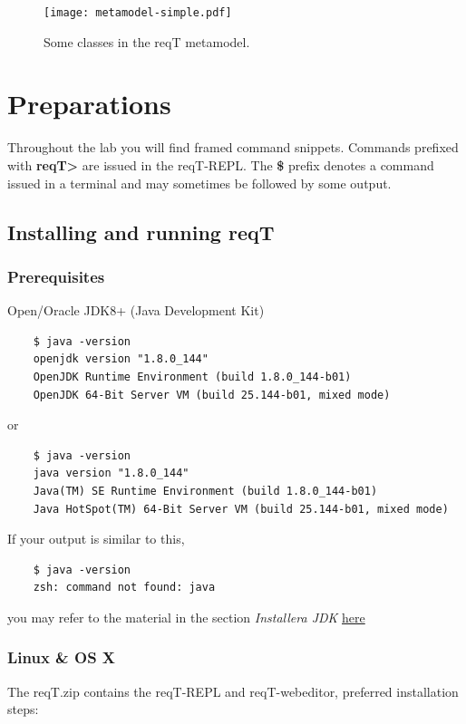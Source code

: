 \documentclass[11pt]{article}
\begin{document}
\begin{figure}[H]
  \centering
  \texttt{[image: metamodel-simple.pdf]}
  \caption{Some classes in the reqT metamodel.}
  \label{figure:metamodel}
\end{figure}

\clearpage\newpage
\section{Preparations}\label{section:preparations}
Throughout the lab you will find framed command snippets. Commands prefixed with \textbf{reqT>} are issued in the reqT-REPL. The \textbf{\$} prefix denotes a command issued in a terminal and may sometimes be followed by some output.
\subsection{Installing and running reqT}\label{section:preparations:installation}

\subsubsection{Prerequisites}
\begin{framed}
\noindent Open/Oracle JDK8+ (Java Development Kit)
{\footnotesize\begin{verbatim}
    $ java -version
    openjdk version "1.8.0_144"
    OpenJDK Runtime Environment (build 1.8.0_144-b01)
    OpenJDK 64-Bit Server VM (build 25.144-b01, mixed mode)
\end{verbatim}}
\noindent or
{\footnotesize\begin{verbatim}
    $ java -version
    java version "1.8.0_144"
    Java(TM) SE Runtime Environment (build 1.8.0_144-b01)
    Java HotSpot(TM) 64-Bit Server VM (build 25.144-b01, mixed mode)
\end{verbatim}}
\noindent If your output is similar to this,
{\footnotesize\begin{verbatim}
    $ java -version
    zsh: command not found: java
\end{verbatim}}
\noindent you may refer to the material in the section \textit{Installera JDK} \href{http://cs.lth.se/pgk/verktyg/}{here}
\end{framed}

\subsubsection{Linux \& OS X}\label{section:preparations:installation:unix}
The reqT.zip contains the reqT-REPL and reqT-webeditor, preferred installation steps:
\end{document}
